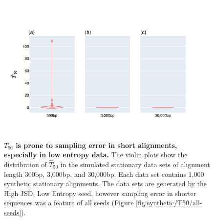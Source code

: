 \begin{figure}[htbp]
\centering
\includegraphics[width=\textwidth]{figures/plots/synthetic/T50/HighJSDLowEntropy-seq_len.pdf}
\caption[$T_{50}$ is prone to sampling error in short alignments, especially in low entropy data]{\textbf{$T_{50}$ is prone to sampling error in short alignments, especially in low entropy data.} The violin plots show the distribution of $\hat T_{50}$ in the simulated stationary data sets of alignment length 300bp, 3,000bp, and 30,000bp. Each data set contains 1,000 synthetic stationary alignments. The data sets are generated by the High JSD, Low Entropy seed, however sampling error in shorter sequences was a feature of all seeds (Figure \ref{fig:synthetic/T50/all-seeds}). }
\label{fig:T50-short_long}
\end{figure}